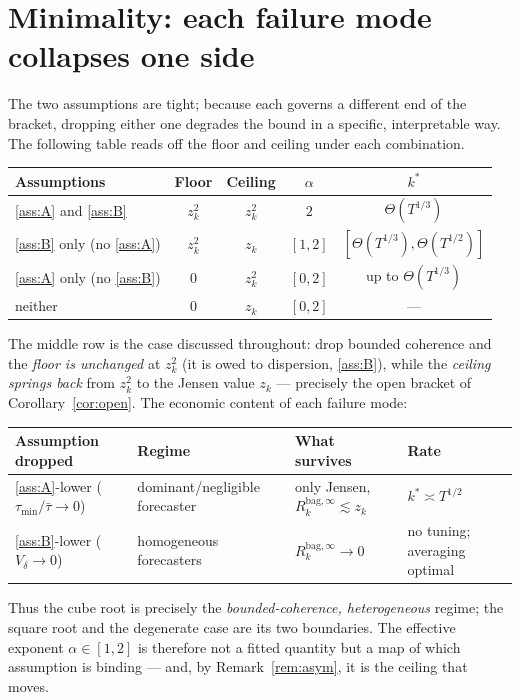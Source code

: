 \documentclass[11pt]{article}
\newcommand{\Rk}{R_k^{\mathrm{bag},\infty}}
\begin{document}
\section{Minimality: each failure mode collapses one side}
The two assumptions are tight; because each governs a different end of the bracket,
dropping either one degrades the bound in a specific, interpretable way. The following
table reads off the floor and ceiling under each combination.

\begin{center}
\begin{tabular}{lcccc}
\hline
Assumptions & Floor & Ceiling & $\alpha$ & $k^\ast$ \\
\hline
\ref{ass:A} and \ref{ass:B} & $z_k^2$ & $z_k^2$ & $2$ & $\Theta(T^{1/3})$ \\
\ref{ass:B} only (no \ref{ass:A}) & $z_k^2$ & $z_k$ & $[1,2]$ & $[\Theta(T^{1/3}),\Theta(T^{1/2})]$ \\
\ref{ass:A} only (no \ref{ass:B}) & $0$ & $z_k^2$ & $[0,2]$ & up to $\Theta(T^{1/3})$ \\
neither & $0$ & $z_k$ & $[0,2]$ & --- \\
\hline
\end{tabular}
\end{center}

\noindent The middle row is the case discussed throughout: drop bounded coherence and the
\emph{floor is unchanged} at $z_k^2$ (it is owed to dispersion, \ref{ass:B}), while the
\emph{ceiling springs back} from $z_k^2$ to the Jensen value $z_k$ --- precisely the open
bracket of Corollary~\ref{cor:open}. The economic content of each failure mode:

\begin{center}
\begin{tabular}{lll l}
\hline
Assumption dropped & Regime & What survives & Rate \\
\hline
\ref{ass:A}-lower ($\tau_{\min}/\bar\tau\to0$) & dominant/negligible forecaster
  & only Jensen, $\Rk\lesssim z_k$ & $k^\ast\asymp T^{1/2}$ \\
\ref{ass:B}-lower ($V_\delta\to0$) & homogeneous forecasters
  & $\Rk\to0$ & no tuning; averaging optimal \\
\hline
\end{tabular}
\end{center}

\noindent Thus the cube root is precisely the \emph{bounded-coherence, heterogeneous}
regime; the square root and the degenerate case are its two boundaries. The effective
exponent $\alpha\in[1,2]$ is therefore not a fitted quantity but a map of which
assumption is binding --- and, by Remark~\ref{rem:asym}, it is the ceiling that moves.
\end{document}
